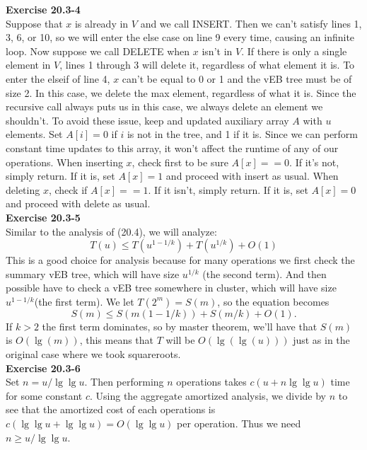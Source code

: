 \documentclass{article}
\begin{document}
\noindent\textbf{Exercise 20.3-4}\\

Suppose that $x$ is already in $V$ and we call INSERT.  Then we can't satisfy lines 1, 3, 6, or 10, so we will enter the else case on line 9 every time, causing an infinite loop.  Now suppose we call DELETE when $x$ isn't in $V$. If there is only a single element in $V$, lines 1 through 3 will delete it, regardless of what element it is.  To enter the elseif of line 4, $x$ can't be equal to 0 or 1 and the vEB tree must be of size 2.  In this case, we delete the max element, regardless of what it is.  Since the recursive call always puts us in this case, we always delete an element we shouldn't.  To avoid these issue, keep and updated auxiliary array $A$ with $u$ elements.  Set $A[i] = 0$ if $i$ is not in the tree, and 1 if it is.  Since we can perform constant time updates to this array, it won't affect the runtime of any of our operations.  When inserting $x$, check first to be sure $A[x] == 0$.  If it's not, simply return.  If it is, set $A[x] = 1$ and proceed with insert as usual.  When deleting $x$, check if $A[x] == 1$.  If it isn't, simply return.  If it is, set $A[x] = 0$ and proceed with delete as usual. \\

\noindent\textbf{Exercise 20.3-5}\\

Similar to the analysis of (20.4), we will analyze:
\[
T(u) \le T(u^{1-1/k}) + T(u^{1/k}) + O(1)
\]
This is a good choice for analysis because for many operations we first check the summary vEB tree, which will have size $u^{1/k}$ (the second term). And then possible have to check a vEB tree somewhere in cluster, which will have size $u^{1-1/k}$(the first term). We let $T(2^m) = S(m)$, so the equation becomes
\[
S(m) \le S(m(1-1/k)) + S(m/k) + O(1).
\]
If $k>2$ the first term dominates, so by master theorem, we'll have that $S(m)$ is $O(\lg(m))$, this means that $T$ will be $O(\lg(\lg(u)))$ just as in the original case where we took squareroots.\\

\noindent\textbf{Exercise 20.3-6}\\

Set $n = u/\lg\lg u$.  Then performing $n$ operations takes $c(u + n\lg\lg u)$ time for some constant $c$.  Using the aggregate amortized analysis, we divide by $n$ to see that the amortized cost of each operations is $c(\lg \lg u + \lg \lg u) = O(\lg \lg u)$ per operation.  Thus we need $n \geq u/\lg\lg u$.\\
\end{document}
